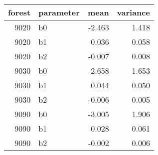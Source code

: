 \begin{table}[ht]
\begin{center}
\begin{tabular}{rlrr}
  \hline
forest & parameter & mean & variance \\ 
  \hline
9020 & b0 & -2.463 & 1.418 \\ 
  9020 & b1 & 0.036 & 0.058 \\ 
  9020 & b2 & -0.007 & 0.008 \\ 
  9030 & b0 & -2.658 & 1.653 \\ 
  9030 & b1 & 0.044 & 0.050 \\ 
  9030 & b2 & -0.006 & 0.005 \\ 
  9090 & b0 & -3.005 & 1.906 \\ 
  9090 & b1 & 0.028 & 0.061 \\ 
  9090 & b2 & -0.002 & 0.006 \\ 
   \hline
\end{tabular}
\end{center}
\end{table}
